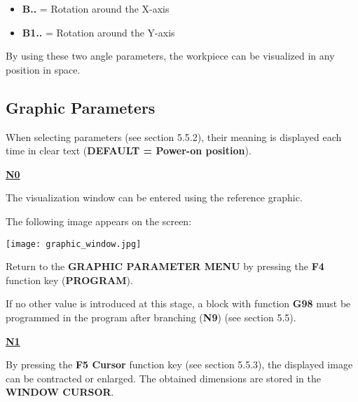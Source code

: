 \begin{itemize}
    \item \textbf{B..} = Rotation around the X-axis
    \item \textbf{B1..} = Rotation around the Y-axis
\end{itemize}

By using these two angle parameters, the workpiece can be visualized in any position in space.

\subsection{Graphic Parameters}

When selecting parameters (see section 5.5.2), their meaning is displayed each time in clear text  
(\textbf{DEFAULT = Power-on position}).

\underline{\textbf{N0}}

The visualization window can be entered using the reference graphic.

\procedure

\begin{itemize}
\end{itemize}

\vspace{.5cm}

\begin{itemize}
\end{itemize}

\vspace{.5cm}

The following image appears on the screen:

\begin{center}
    \texttt{[image: graphic\_window.jpg]}
\end{center}

Return to the \textbf{GRAPHIC PARAMETER MENU} by pressing the \textbf{F4} function key (\textbf{PROGRAM}).

\notes

If no other value is introduced at this stage, a block with function \textbf{G98} must be programmed in the program after branching (\textbf{N9}) (see section 5.5).

\underline{\textbf{N1}}

By pressing the \textbf{F5 Cursor} function key (see section 5.5.3), the displayed image can be contracted or enlarged.  
The obtained dimensions are stored in the \textbf{WINDOW CURSOR}.

